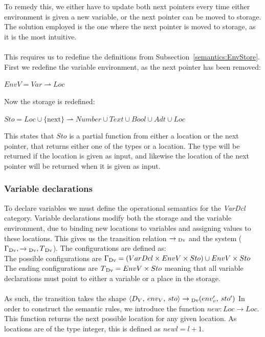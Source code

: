 \\\\
To remedy this, we either have to update both next pointers every time either environment is given a new variable, or the next pointer can be moved to storage. The solution employed is the one where the next pointer is moved to storage, as it is the most intuitive.
\\\\
This requires us to redefine the definitions from Subsection~\ref{semantics:EnvStore}. First we redefine the variable environment, as the next pointer has been removed:
\begin{center}
$EnvV = Var \rightharpoonup Loc$
\end{center}
Now the storage is redefined:
\begin{center}
$Sto = Loc \cup \text{\{next\}} \rightharpoonup Number \cup Text \cup Bool \cup Adt \cup Loc $
\end{center}
This states that $Sto$ is a partial function from either a location or the next pointer, that returns either one of the types or a location. The type will be returned if the location is given as input, and likewise the location of the next pointer will be returned when it is given as input.
\subsubsection{Variable declarations}
To declare variables we must define the operational semantics for the \textit{VarDcl} category. 
Variable declarations modify both the storage and the variable environment, due to binding new locations to variables and assigning values to these locations. This gives us the transition relation $\xrightarrow{}\textsubscript{Dv}$ and the system ($\Gamma \textsubscript{Dv}, \xrightarrow{}\textsubscript{Dv}, T \textsubscript{Dv}$). The configurations are defined as:
\\
The possible configurations are $\Gamma \textsubscript{Dv} = (VarDcl \times EnvV \times Sto) \cup EnvV \times Sto$\\
The ending configurations are
$T\textsubscript{Dv} = EnvV \times Sto$ meaning that all variable declarations must point to either a variable or a place in the storage. 
\\\\
As such, the transition takes the shape $\langle D_V, \: env_V, \: sto \rangle \xrightarrow{}\textsubscript{Dv} (env'_v, \: sto')$ In order to construct the semantic rules, we introduce the function $new: Loc \xrightarrow{} Loc$. This function returns the next possible location for any given location. As locations are of the type integer, this is defined as $new l = l + 1$.

